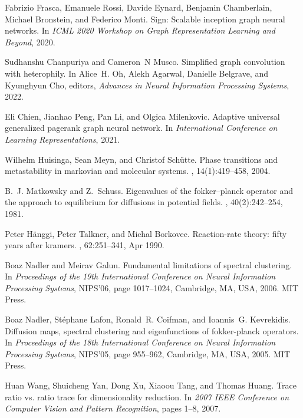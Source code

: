 \documentclass{article}
\theoremstyle{plain}
\theoremstyle{definition}
\begin{document}
{\begin{thebibliography}{10}
Fabrizio Frasca, Emanuele Rossi, Davide Eynard, Benjamin Chamberlain, Michael
  Bronstein, and Federico Monti.
\newblock Sign: Scalable inception graph neural networks.
\newblock In {\em ICML 2020 Workshop on Graph Representation Learning and
  Beyond}, 2020.

Sudhanshu Chanpuriya and Cameron~N Musco.
\newblock Simplified graph convolution with heterophily.
\newblock In Alice~H. Oh, Alekh Agarwal, Danielle Belgrave, and Kyunghyun Cho,
  editors, {\em Advances in Neural Information Processing Systems}, 2022.

Eli Chien, Jianhao Peng, Pan Li, and Olgica Milenkovic.
\newblock Adaptive universal generalized pagerank graph neural network.
\newblock In {\em International Conference on Learning Representations}, 2021.

Wilhelm Huisinga, Sean Meyn, and Christof Schütte.
\newblock Phase transitions and metastability in markovian and molecular
  systems.
, 14(1):419--458, 2004.

B.~J. Matkowsky and Z.~Schuss.
\newblock Eigenvalues of the fokker–planck operator and the approach to
  equilibrium for diffusions in potential fields.
, 40(2):242--254, 1981.

Peter H\"anggi, Peter Talkner, and Michal Borkovec.
\newblock Reaction-rate theory: fifty years after kramers.
, 62:251--341, Apr 1990.

Boaz Nadler and Meirav Galun.
\newblock Fundamental limitations of spectral clustering.
\newblock In {\em Proceedings of the 19th International Conference on Neural
  Information Processing Systems}, NIPS'06, page 1017–1024, Cambridge, MA,
  USA, 2006. MIT Press.

Boaz Nadler, St\'{e}phane Lafon, Ronald~R. Coifman, and Ioannis~G. Kevrekidis.
\newblock Diffusion maps, spectral clustering and eigenfunctions of
  fokker-planck operators.
\newblock In {\em Proceedings of the 18th International Conference on Neural
  Information Processing Systems}, NIPS'05, page 955–962, Cambridge, MA, USA,
  2005. MIT Press.

Huan Wang, Shuicheng Yan, Dong Xu, Xiaoou Tang, and Thomas Huang.
\newblock Trace ratio vs. ratio trace for dimensionality reduction.
\newblock In {\em 2007 IEEE Conference on Computer Vision and Pattern
  Recognition}, pages 1--8, 2007.


\end{thebibliography}}
\end{document}
